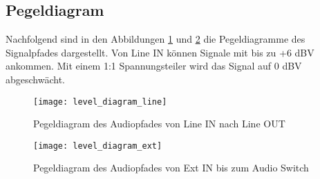 \subsection{Pegeldiagram}
\label{sec:Pegeldiagram}

Nachfolgend sind in den Abbildungen \ref{pic:Pegeldiagram_Line} und \ref{pic:Pegeldiagram_Ext} die Pegeldiagramme des Signalpfades dargestellt.
Von Line IN können Signale mit bis zu +6 \si{dBV} ankommen. Mit einem 1:1 Spannungsteiler wird das Signal auf 0 \si{dBV} abgeschwächt.

\begin{figure}[h]
	\centering
	\texttt{[image: level\_diagram\_line]}
	\caption{Pegeldiagram des Audiopfades von Line IN nach Line OUT}
	\label{pic:Pegeldiagram_Line}
\end{figure}


\begin{figure}[h]
	\centering
	\texttt{[image: level\_diagram\_ext]}
	\caption{Pegeldiagram des Audiopfades von Ext IN bis zum Audio Switch}
	\label{pic:Pegeldiagram_Ext}
\end{figure}

